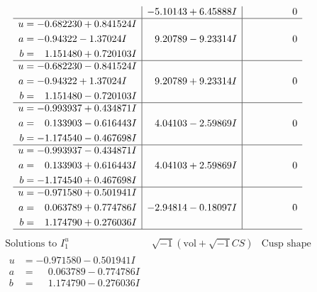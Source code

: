 \documentclass[1p]{elsarticle_modified}
\theoremstyle{definition}
\newcommand{\I}{\sqrt{-1}}
\begin{document}
$$\begin{array}{c|c|c}
 & -5.10143 + 6.45888 I & \phantom{-0.000000 } 0 \\ \hline\begin{aligned}
u &= -0.682230 + 0.841524 I \\
a &= -0.94322 - 1.37024 I \\
b &= \phantom{-}1.151480 + 0.720103 I\end{aligned}
 & \phantom{-}9.20789 - 9.23314 I & \phantom{-0.000000 } 0 \\ \hline\begin{aligned}
u &= -0.682230 - 0.841524 I \\
a &= -0.94322 + 1.37024 I \\
b &= \phantom{-}1.151480 - 0.720103 I\end{aligned}
 & \phantom{-}9.20789 + 9.23314 I & \phantom{-0.000000 } 0 \\ \hline\begin{aligned}
u &= -0.993937 + 0.434871 I \\
a &= \phantom{-}0.133903 - 0.616443 I \\
b &= -1.174540 - 0.467698 I\end{aligned}
 & \phantom{-}4.04103 - 2.59869 I & \phantom{-0.000000 } 0 \\ \hline\begin{aligned}
u &= -0.993937 - 0.434871 I \\
a &= \phantom{-}0.133903 + 0.616443 I \\
b &= -1.174540 + 0.467698 I\end{aligned}
 & \phantom{-}4.04103 + 2.59869 I & \phantom{-0.000000 } 0 \\ \hline\begin{aligned}
u &= -0.971580 + 0.501941 I \\
a &= \phantom{-}0.063789 + 0.774786 I \\
b &= \phantom{-}1.174790 + 0.276036 I\end{aligned}
 & -2.94814 - 0.18097 I & \phantom{-0.000000 } 0\\
 \hline 
 \end{array}$$\newpage$$\begin{array}{c|c|c}  
\text{Solutions to }I^u_{1}& \I (\text{vol} + \sqrt{-1}CS) & \text{Cusp shape}\\
 \hline 
\begin{aligned}
u &= -0.971580 - 0.501941 I \\
a &= \phantom{-}0.063789 - 0.774786 I \\
b &= \phantom{-}1.174790 - 0.276036 I\end{aligned}

\end{array}$$
\end{document}

